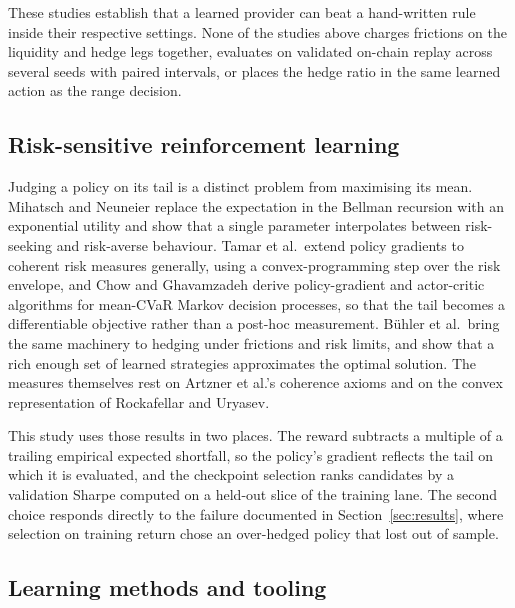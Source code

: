 These studies establish that a learned provider can beat a hand-written rule
inside their respective settings. None of the studies above charges frictions
on the liquidity and hedge legs together, evaluates on validated on-chain
replay across several seeds with paired intervals, or places the hedge ratio in
the same learned action as the range decision.

\subsection{Risk-sensitive reinforcement learning}

Judging a policy on its tail is a distinct problem from maximising its mean.
Mihatsch and Neuneier replace the expectation in the Bellman recursion with an
exponential utility and show that a single parameter interpolates between
risk-seeking and risk-averse behaviour\cite{mihatsch2002risk}. Tamar et al.\
extend policy gradients to coherent risk measures generally, using a
convex-programming step over the risk envelope\cite{tamar2015policy}, and Chow
and Ghavamzadeh derive policy-gradient and actor-critic algorithms for
mean-CVaR Markov decision processes, so that the tail becomes a differentiable
objective rather than a post-hoc measurement\cite{chow2014algorithms}. B\"uhler
et al.\ bring the same machinery to hedging under frictions and risk limits,
and show that a rich enough set of learned strategies approximates the optimal
solution\cite{buehler2018deep}. The measures themselves rest on Artzner et
al.'s coherence axioms\cite{artzner1999coherent} and on the convex
representation of Rockafellar and Uryasev\cite{rockafellar2000cvar}.

This study uses those results in two places. The reward subtracts a multiple
of a trailing empirical expected shortfall, so the policy's gradient reflects
the tail on which it is evaluated, and the checkpoint selection ranks
candidates by a validation Sharpe computed on a held-out slice of the training
lane. The second choice responds directly to the failure documented in
Section~\ref{sec:results}, where selection on training return chose an
over-hedged policy that lost out of sample.

\subsection{Learning methods and tooling}

